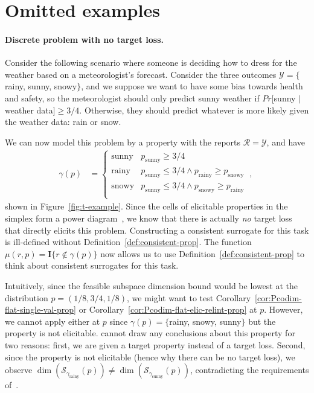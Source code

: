 \documentclass[anon,12pt]{colt2021} %
\newcommand{\propdis}{\mu}
\newcommand{\R}{\mathcal{R}}
\newcommand{\Sc}{\mathcal{S}}  %
\newcommand{\Y}{\mathcal{Y}}
\newcommand{\Ind}[1]{\mathbf{I}\{{#1}\}}
\begin{document}
\section{Omitted examples}\label{app:omitted-examples}
\paragraph{Discrete problem with no target loss.}
Consider the following scenario where someone is deciding how to dress for the weather based on a meteorologist's forecast.
Consider the three outcomes $\Y = \{$rainy, sunny, snowy$\}$, and we suppose we want to have some bias towards health and safety, so the meteorologist should only predict sunny weather if $Pr[$sunny $|$ weather data$] \geq 3/4$.
Otherwise, they should predict whatever is more likely  given the weather data: rain or snow.

We can now model this problem by a property with the reports $\R = \Y$, and have 
\begin{align*}
\gamma(p) &= \begin{cases}
\text{sunny} & p_{\text{sunny}} \geq 3/4 \\
\text{rainy} & p_{\text{sunny}} \leq 3/4 \wedge p_{\text{rainy}} \geq p_{\text{snowy}} \\
\text{snowy} & p_{\text{sunny}} \leq 3/4 \wedge p_{\text{snowy}} \geq p_{\text{rainy}} \\
\end{cases}~,~
\end{align*} 
shown in Figure~\ref{fig:t-example}.
Since the cells of elicitable properties in the simplex form a power diagram~\citep{lambert2009eliciting}, we know that there is actually \emph{no} target loss that directly elicits this problem.
Constructing a consistent surrogate for this task is ill-defined without Definition~\ref{def:consistent-prop}.
The function $\propdis(r,p) = \Ind{r \not \in \gamma(p)}$ 
now allows us to use Definition~\ref{def:consistent-prop} to think about consistent surrogates for this task.

Intuitively, since the feasible subspace dimension bound would be lowest at the distribution $p = (1/8, 3/4,1/8)$, we might want to test Corollary~\ref{cor:Pcodim-flat-single-val-prop} or Corollary~\ref{cor:Pcodim-flat-elic-relint-prop} at $p$.
However, we cannot apply either at $p$ since $\gamma(p) = \{$rainy, snowy, sunny$\}$ but the property is not elicitable.
\citet[Theorem 16]{ramaswamy2016convex} cannot draw any conclusions about this property for two reasons: first, we are given a target property instead of a target loss.
Second, since the property is not elicitable (hence why there can be no target loss), we observe $\dim(\Sc_{\gamma_{\text{rainy}}}(p)) \neq \dim(\Sc_{\gamma_{\text{sunny}}}(p))$, contradicting the requirements of~\citet[Lemma 23]{ramaswamy2016convex}.
\end{document}
